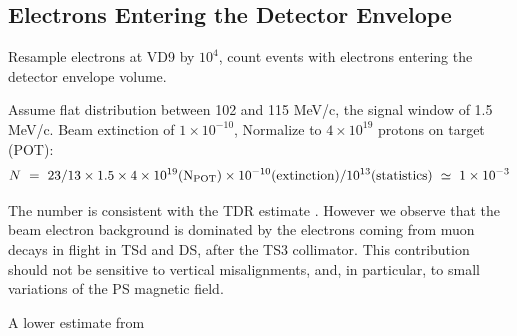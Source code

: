 \documentclass[12pt]{article}
\begin{document}
\subsection {Electrons Entering the Detector Envelope}

Resample electrons at VD9 by $10^4$, count events with electrons entering the detector envelope volume.

Assume flat distribution between 102 and 115 MeV/c, the signal window of 1.5 MeV/c.
Beam extinction of $1 \times 10^{-10}$, Normalize to $4 \times 10^{19}$ protons on target (POT):
$$
              N ~=~ 23/13 \times 1.5 \times 4 \times 10^{19} ({\rm N_{POT}}) \times 10^{-10}  ({\rm extinction}) / 10^{13} ({\rm statistics}) ~\simeq ~ 1 \times 10^{-3}
$$

The number is consistent with the TDR estimate \cite{MU2E_6464_CD3_BEAM_ELECTRONS}.
However we observe that the beam electron background is dominated by the electrons coming
from muon decays in flight in TSd and DS, after the TS3 collimator.
This contribution should not be sensitive to vertical misalignments,
and, in particular, to small variations of the PS magnetic field.

A lower estimate from 
\end{document}
